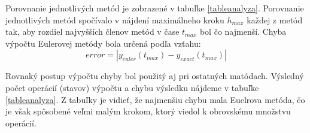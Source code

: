 Porovnanie jednotlivých metód je zobrazené v tabuľke \ref{tableanalyza}. Porovnanie jednotlivých metód spočívalo v nájdení maximálneho kroku $ h_{max} $ každej z metód tak, aby rozdiel najvyšších členov metód v čase $ t_{max} $ bol čo najmenší. Chyba výpočtu Eulerovej metódy bola určená podľa vzťahu:
\begin{equation}
error = |y_{euler}(t_{max}) - y_{exact}(t_{max})|
\end{equation}
\bigskip

Rovnaký postup výpočtu chyby bol použitý aj pri ostatných matódach. Výsledný počet operácií (stavov) výpočtu a chybu výsledku nájdeme v tabuľke \ref{tableanalyza}. Z tabuľky je vidieť, že najmenšiu chybu mala Euelrova metóda, čo je však spôsobené veľmi malým krokom, ktorý viedol k obrovskému množstvu operácií. 




